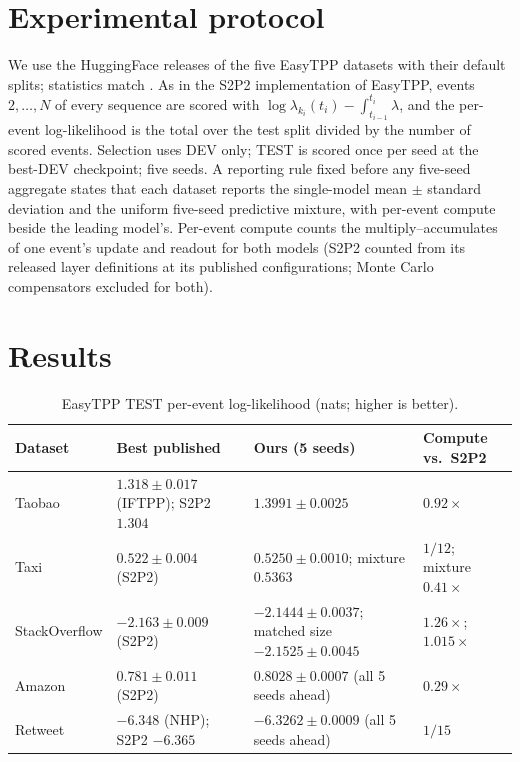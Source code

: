 \documentclass[11pt]{article}
\begin{document}
\section{Experimental protocol}\label{sec:protocol}
We use the HuggingFace releases of the five EasyTPP datasets with their default splits; statistics match \citep{chang2025s2p2,boyd2025hhp}. As in the S2P2 implementation of EasyTPP, events $2,\dots,N$ of every sequence are scored with $\log\lambda_{k_i}(t_i)-\int_{t_{i-1}}^{t_i}\lambda$, and the per-event log-likelihood is the total over the test split divided by the number of scored events. Selection uses DEV only; TEST is scored once per seed at the best-DEV checkpoint; five seeds. A reporting rule fixed before any five-seed aggregate states that each dataset reports the single-model mean $\pm$ standard deviation and the uniform five-seed predictive mixture, with per-event compute beside the leading model's. Per-event compute counts the multiply--accumulates of one event's update and readout for both models (S2P2 counted from its released layer definitions at its published configurations; Monte Carlo compensators excluded for both).

\section{Results}\label{sec:results}
\begin{table}[h]
\centering\small
\begin{tabular}{@{}p{2.2cm}p{3.9cm}p{5.6cm}p{2.4cm}@{}}
\toprule
Dataset & Best published & Ours (5 seeds) & Compute vs.\ S2P2 \\
\midrule
Taobao & $1.318\pm0.017$ (IFTPP); S2P2 $1.304$ & $\mathbf{1.3991\pm0.0025}$ & $0.92\times$ \\
Taxi & $0.522\pm0.004$ (S2P2) & $\mathbf{0.5250\pm0.0010}$; mixture $\mathbf{0.5363}$ & $1/12$; mixture $0.41\times$ \\
StackOverflow & $-2.163\pm0.009$ (S2P2) & $\mathbf{-2.1444\pm0.0037}$; matched size $\mathbf{-2.1525\pm0.0045}$ & $1.26\times$; $1.015\times$ \\
Amazon & $0.781\pm0.011$ (S2P2) & $\mathbf{0.8028\pm0.0007}$ (all 5 seeds ahead) & $0.29\times$ \\
Retweet & $-6.348$ (NHP); S2P2 $-6.365$ & $\mathbf{-6.3262\pm0.0009}$ (all 5 seeds ahead) & $1/15$ \\
\bottomrule
\end{tabular}
\caption{EasyTPP TEST per-event log-likelihood (nats; higher is better).}
\label{tab:results}
\end{table}
\end{document}
